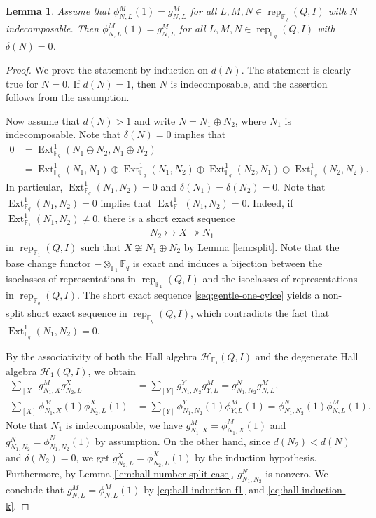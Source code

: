 \documentclass[12pt]{amsart}
\newtheorem{lemma}[theorem]{Lemma}
\theoremstyle{remark}
\theoremstyle{definition}
\numberwithin{equation}{section}
\newcommand{\Ext}{\operatorname{Ext}\nolimits}
\begin{document}
\begin{lemma}\label{lem:hall-number-equ when delta(N)=0}
    Assume that $\phi_{N,L}^M(1)=g_{N,L}^M$ for all $L,M,N\in \operatorname{rep}_{\mathbb{F}_q}(Q,I)$ with $N$ indecomposable. Then $\phi_{N,L}^M(1)=g_{N,L}^M$ for all $L,M,N\in \operatorname{rep}_{\mathbb{F}_q}(Q,I)$ with $\delta(N)=0$.
\end{lemma}
\begin{proof}
    We prove the statement by induction on $d(N)$. The statement is clearly true for $N=0$. If $d(N)=1$, then $N$ is indecomposable, and the assertion follows from the assumption.

    Now assume that $d(N)>1$ and write $N=N_1\oplus N_2$, where $N_1$ is indecomposable. Note that $\delta(N)=0$ implies that
    \begin{align*}
        0&=\Ext_{\mathbb{F}_q}^1(N_1\oplus N_2, N_1\oplus N_2)\\
        &=\Ext_{\mathbb{F}_q}^1(N_1,N_1)\oplus \Ext_{\mathbb{F}_q}^1(N_1,N_2)\oplus \Ext_{\mathbb{F}_q}^1(N_2, N_1)\oplus \Ext_{\mathbb{F}_q}^1(N_2,N_2).
    \end{align*}
    In particular, $\Ext_{\mathbb{F}_q}^1(N_1, N_2)=0$ and $\delta(N_1)=\delta(N_2)=0$.
     Note that $\Ext_{\mathbb{F}_q}^1(N_1,N_2)=0$ implies that $\Ext_{\mathbb{F}_1}^1(N_1,N_2)=0$. Indeed, if $\Ext_{\mathbb{F}_1}^1(N_1,N_2)\neq 0$, there is a short exact sequence 
     \begin{align}\label{seq:gentle-one-cylce}
         N_2\rightarrowtail X\twoheadrightarrow N_1
     \end{align} in $\operatorname{rep}_{\mathbb{F}_1}(Q,I)$ such that $X\not\cong N_1\oplus N_2$ by Lemma \ref{lem:split}. Note that the base change functor $-\otimes_{\mathbb{F}_1}\mathbb{F}_q$ is exact and induces a bijection between the isoclasses of representations in $\operatorname{rep}_{\mathbb{F}_1}(Q,I)$ and the isoclasses of representations in $\operatorname{rep}_{\mathbb{F}_q}(Q,I)$. The short exact sequence \eqref{seq:gentle-one-cylce} yields a non-split short exact sequence in $\operatorname{rep}_{\mathbb{F}_q}(Q,I)$, which contradicts  the fact that $\Ext^1_{\mathbb{F}_q}(N_1,N_2)=0$.
     
    By the associativity of both the Hall algebra $\mathcal{H}_{\mathbb{F}_1}(Q,I)$ and the degenerate Hall algebra $\mathcal{H}_1(Q,I)$, we obtain
    \begin{align}
        \sum_{[X]}g_{N_1,X}^Mg_{N_2,L}^X&=\sum_{[Y]}g_{N_1,N_2}^Yg_{Y,L}^M=g_{N_1,N_2}^{N}g_{N,L}^M,\label{eq:hall-induction-f1}\\
 \sum_{[X]}\phi_{N_1,X}^M(1)\phi_{N_2,L}^X(1)&=\sum_{[Y]}\phi_{N_1,N_2}^Y(1)\phi_{Y,L}^M(1)=\phi_{N_1,N_2}^{N}(1)\phi_{N,L}^M(1).\label{eq:hall-induction-k}
    \end{align}
  Note that $N_1$ is indecomposable, we have $g_{N_1,X}^M=\phi_{N_1,X}^M(1)$ and $g_{N_1,N_2}^N=\phi_{N_1,N_2}^N(1)$ by assumption. On the other hand, since $d(N_2)<d(N)$ and $\delta(N_2)=0$, we get $g_{N_2,L}^X=\phi_{N_2,L}^X(1)$ by the induction hypothesis. Furthermore, by Lemma \ref{lem:hall-number-split-case}, $g_{N_1,N_2}^N$ is nonzero. We conclude that  $g_{N,L}^M=\phi_{N,L}^M(1)$ by \eqref{eq:hall-induction-f1} and \eqref{eq:hall-induction-k}.
 

\end{proof}
\end{document}
